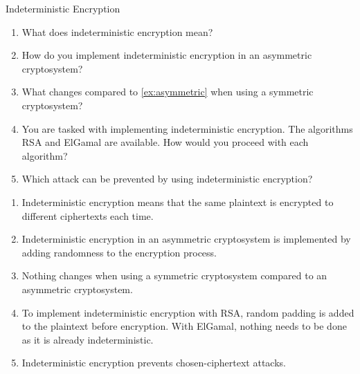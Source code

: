 \documentclass{article}
\begin{document}
\begin{exercise}{Indeterministic Encryption}
  \begin{enumerate}
    \item What does indeterministic encryption mean?
    \item\label{ex:asymmetric} How do you implement indeterministic encryption in an asymmetric cryptosystem?
    \item What changes compared to \ref{ex:asymmetric} when using a symmetric cryptosystem?
    \item You are tasked with implementing indeterministic encryption. The algorithms RSA and ElGamal are available. How would you proceed with each algorithm?
    \item Which attack can be prevented by using indeterministic encryption?
  \end{enumerate}

  \begin{solution}
    \begin{enumerate}
      \item Indeterministic encryption means that the same plaintext is encrypted to different ciphertexts each time.
      \item Indeterministic encryption in an asymmetric cryptosystem is implemented by adding randomness to the encryption process.
      \item Nothing changes when using a symmetric cryptosystem compared to an asymmetric cryptosystem.
      \item To implement indeterministic encryption with RSA, random padding is added to the plaintext before encryption. With ElGamal, nothing needs to be done as it is already indeterministic.
      \item Indeterministic encryption prevents chosen-ciphertext attacks.
    \end{enumerate}
  \end{solution}
\end{exercise}
\end{document}
